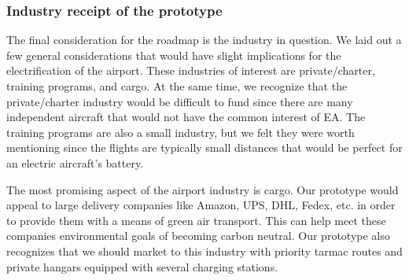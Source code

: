 \documentclass[../main.tex]{subfiles}
\begin{document}
\subsubsection{Industry receipt of the prototype}
The final consideration for the roadmap is the industry in question. We laid out a few general considerations that would have slight implications for the electrification of the airport. These industries of interest are private/charter, training programs, and cargo. At the same time, we recognize that the private/charter industry would be difficult to fund since there are many independent aircraft that would not have the common interest of EA. The training programs are also a small industry, but we felt they were worth mentioning since the flights are typically small distances that would be perfect for an electric aircraft's battery.\par
The most promising aspect of the airport industry is cargo. Our prototype would appeal to large delivery companies like Amazon, UPS, DHL, Fedex, etc. in order to provide them with a means of green air transport. This can help meet these companies environmental goals of becoming carbon neutral. Our prototype also recognizes that we should market to this industry with priority tarmac routes and private hangars equipped with several charging stations. 

\newpage
\end{document}
